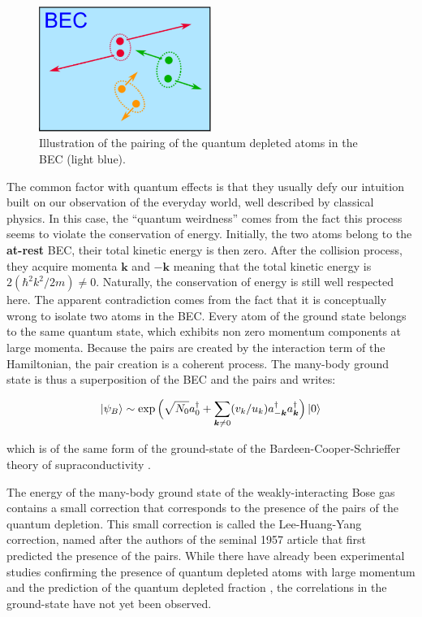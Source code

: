 \begin{figure}
    \centering
    \includegraphics[width=0.5\textwidth]{Fig/Chapter1/pairs.png}
    \caption[Illustration of the \kmk pairing of the quantum depleted atoms in the BEC]{Illustration of the \kmk pairing of the quantum depleted atoms in the BEC (light blue).}
    \label{fig:bec_pairs}
\end{figure}

The common factor with quantum effects is that they usually defy our intuition built on our observation of the everyday world, well described by classical physics. In this case, the ``quantum weirdness'' comes from the fact this process seems to violate the conservation of energy. Initially, the two atoms belong to the \textbf{at-rest} BEC, their total kinetic energy is then zero. After the collision process, they acquire momenta $\bm{k}$ and $-\bm{k}$ meaning that the total kinetic energy is $2 (\hbar^2 k^2/2m) \neq 0$. Naturally, the conservation of energy is still well respected here. The apparent contradiction comes from the fact that it is conceptually wrong to isolate two atoms in the BEC. Every atom of the ground state belongs to the same quantum state, which exhibits non zero momentum components at large momenta. Because the pairs are created by the interaction term of the Hamiltonian, the pair creation is a coherent process. The many-body ground state is thus a superposition of the BEC and the pairs and writes:

\begin{equation}
     \ket{\psi_B} \sim \exp \Big(\sqrt{N_0} a^{\dagger}_0 + \sum_{\bm{k} \neq 0} (v_k/u_k) a^{\dagger}_{-\bm{k}} a^{\dagger}_{\bm{k}} \Big) \ket{0}
     \label{eq:ground_state}
\end{equation}

\noindent which is of the same form of the ground-state of the Bardeen-Cooper-Schrieffer theory of supraconductivity \cite{BCS1957}. 

The energy of the many-body ground state of the weakly-interacting Bose gas contains a small correction that corresponds to the presence of the \kmk pairs of the quantum depletion. This small correction is called the Lee-Huang-Yang correction, named after the authors of the seminal 1957 article \cite{lee1957} that first predicted the presence of the \kmk pairs. While there have already been experimental studies confirming the presence of quantum depleted atoms with large momentum \cite{sokol1995,xu2006} and the prediction of the quantum depleted fraction \cite{lopes2017}, the \kmk correlations in the ground-state have not yet been observed.

